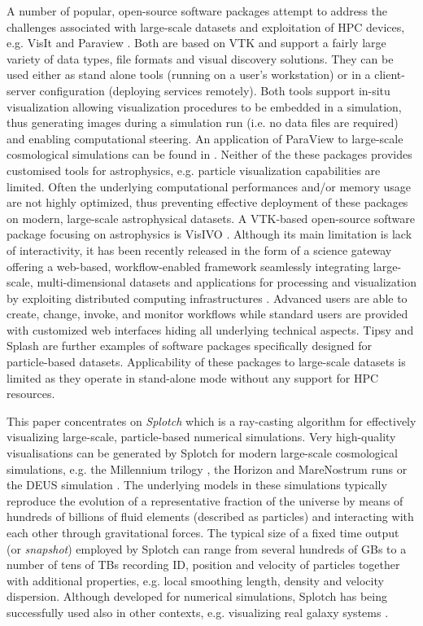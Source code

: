 \documentclass[11pt]{article}
\begin{document}
A number of popular, open-source software packages attempt to address the challenges associated with large-scale datasets and exploitation of HPC devices, e.g. VisIt \cite{visit} and Paraview \cite{paraview}. Both are based on VTK \cite{vtk} and support a fairly large variety of data types, file formats and visual discovery solutions. They can be used either as stand alone tools (running on a user's workstation) or in a client-server configuration (deploying services remotely). Both tools support in-situ visualization allowing visualization procedures to be embedded in a simulation, thus generating images during a simulation run (i.e. no data files are required) and enabling computational steering. An application of ParaView to large-scale cosmological simulations can be found in \cite{2011ApJS..195...11W}. Neither of the these packages provides customised tools for astrophysics,  e.g. particle visualization capabilities are limited. Often the underlying computational performances and/or memory usage are not highly optimized, thus preventing effective deployment of these packages on modern, large-scale astrophysical datasets. A VTK-based open-source software package focusing on astrophysics is VisIVO \cite{}. Although its main limitation is lack of interactivity, it has been recently released in the form of a science gateway offering a web-based, workflow-enabled framework seamlessly integrating large-scale, multi-dimensional datasets and applications for processing and visualization by exploiting distributed computing infrastructures \cite{}. Advanced users are able to create, change, invoke, and monitor workflows while standard users are provided with customized web interfaces hiding all underlying technical aspects. Tipsy \cite{tipsyurl} and Splash \cite{splash} are further examples of software packages specifically designed for particle-based datasets. Applicability of these packages to large-scale datasets is limited as they operate in stand-alone mode without any support for HPC resources.

This paper concentrates on {\it Splotch} \cite{2008NJPh...10l5006D} which is a ray-casting algorithm for effectively visualizing large-scale, particle-based numerical simulations. Very high-quality visualisations can be generated by Splotch for modern large-scale cosmological simulations, e.g. the Millennium trilogy \cite{millennium}, the Horizon and MareNostrum runs \cite{horizon} or the DEUS simulation \cite{deus}. The underlying models in these simulations typically reproduce the evolution of a representative fraction of the universe by means of hundreds of billions of fluid elements (described as particles) and interacting with each other through gravitational forces. The typical size of a fixed time output (or {\it snapshot}) employed by Splotch can range from several hundreds of GBs to a number of tens of TBs recording ID, position and velocity of particles together with additional properties, e.g. local smoothing length, density and velocity dispersion. Although developed for numerical simulations, Splotch has being successfully used 
also in other contexts, e.g. visualizing real galaxy systems \cite{}.
\end{document}
